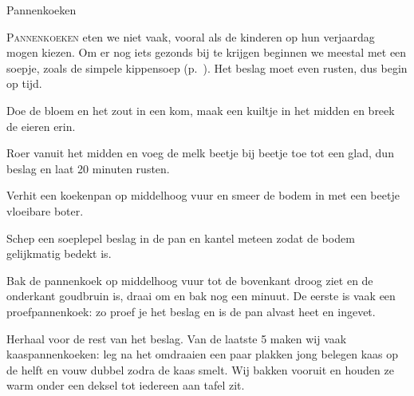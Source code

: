 \begin{recipe}{Pannenkoeken}


\lettrine{P}{annenkoeken} eten we niet vaak, vooral als de kinderen op hun
verjaardag mogen kiezen. Om er nog iets gezonds bij te krijgen beginnen we
meestal met een soepje, zoals de simpele kippensoep
(p.~\pageref{recipe:kippensoep-simpel}). Het beslag moet even rusten, dus
begin op tijd.

\begin{ingredients}
\end{ingredients}

\begin{steps}
  \item Doe de bloem en het zout in een kom, maak een kuiltje in het midden
        en breek de eieren erin.
  \item Roer vanuit het midden en voeg de melk beetje bij beetje toe tot een
        glad, dun beslag en laat 20 minuten rusten.
  \item Verhit een koekenpan op middelhoog vuur en smeer de bodem in met een
        beetje vloeibare boter.
  \item Schep een soeplepel beslag in de pan en kantel meteen zodat de bodem
        gelijkmatig bedekt is.
  \item Bak de pannenkoek op middelhoog vuur tot de bovenkant droog ziet en
        de onderkant goudbruin is, draai om en bak nog een minuut. De eerste
        is vaak een proefpannenkoek: zo proef je het beslag en is de pan
        alvast heet en ingevet.
  \item Herhaal voor de rest van het beslag. Van de laatste 5 maken wij vaak
        kaaspannenkoeken: leg na het omdraaien een paar plakken jong belegen
        kaas op de helft en vouw dubbel zodra de kaas smelt. Wij bakken
        vooruit en houden ze warm onder een deksel tot iedereen aan tafel zit.
\end{steps}
\end{recipe}
